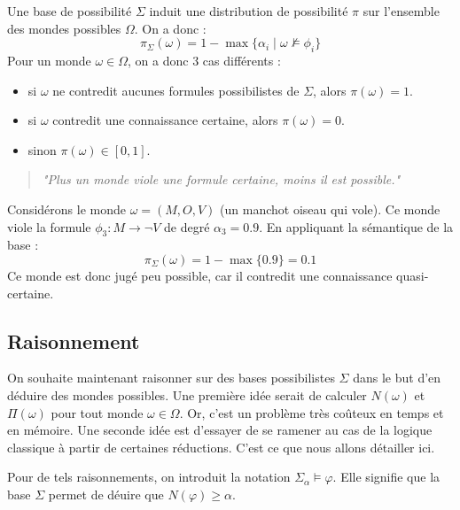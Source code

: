 \begin{definition}
    Une base de possibilité $ \Sigma$ induit une distribution de possibilité $ \pi$ 
    sur l'ensemble des mondes possibles $ \Omega$. On a donc : 
    \begin{equation}
        \pi_\Sigma(\omega) = 1 - \max \{ \alpha_i \mid \omega \not\models \phi_i \}
    \end{equation}
    Pour un monde $ \omega \in \Omega$, on a donc 3 cas différents : 
    \begin{itemize}
        \item si $ \omega$ ne contredit aucunes formules possibilistes de $ \Sigma$, alors 
        $ \pi ( \omega) = 1$. 
        \item si $ \omega$ contredit une connaissance certaine, alors $ \pi ( \omega) = 0$. 
        \item sinon $ \pi( \omega) \in [0, 1]$. 
    \end{itemize}
    \begin{quote}
        \emph{"Plus un monde viole une formule certaine, moins il est possible."}
    \end{quote}
\end{definition}

\begin{example}
    Considérons le monde $\omega = (M, O, V)$ (un manchot oiseau qui vole). 
    Ce monde viole la formule $\phi_3 : M \to \neg V$ de degré $\alpha_3 = 0.9$. 
    En appliquant la sémantique de la base :
    \[ \pi_\Sigma(\omega) = 1 - \max \{ 0.9 \} = 0.1 \]
    Ce monde est donc jugé peu possible, car il contredit une connaissance quasi-certaine.
\end{example}

\subsection{Raisonnement}

On souhaite maintenant raisonner sur des bases possibilistes $ \Sigma$ dans le but d'en déduire des mondes 
possibles. 
Une première idée serait de calculer $ N( \omega)$ et $ \Pi( \omega) $ pour tout monde $ \omega \in \Omega$. 
Or, c'est un problème très coûteux en temps et en mémoire. 
Une seconde idée est d'essayer de se ramener au cas de la logique classique à partir de certaines réductions. 
C'est ce que nous allons détailler ici. 

\begin{notation}
    Pour de tels raisonnements, on introduit la notation $ \Sigma_{ \alpha} \models \varphi$. 
    Elle signifie que la base $ \Sigma$ permet de déuire que $ N ( \varphi) \geqslant \alpha$. 
\end{notation}

